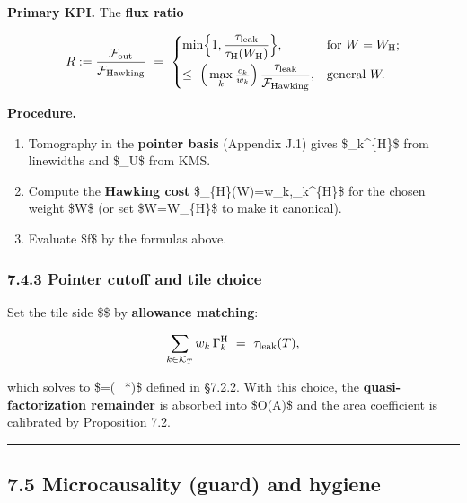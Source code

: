 \documentclass[
]{article}
\providecommand{\tightlist}{%
  \setlength{\itemsep}{0pt}\setlength{\parskip}{0pt}}
\numberwithin{equation}{section}
\begin{document}
\textbf{Primary KPI.} The \textbf{flux ratio}

\[
R:=\frac{\mathcal F_{\rm out}}{\mathcal F_{\rm Hawking}}\ =\
\begin{cases}
\displaystyle \min\!\Big\{1,\frac{\tau_{\rm leak}}{\tau_{\rm H}(W_{\rm H})}\Big\}, & \text{for }W=W_{\rm H};\\[8pt]
\displaystyle \le\ \Big(\max_k \tfrac{c_k}{w_k}\Big)\,\frac{\tau_{\rm leak}}{\mathcal F_{\rm Hawking}}, & \text{general }W.
\end{cases}
\]

\textbf{Procedure.}

\begin{enumerate}
\def\labelenumi{\arabic{enumi}.}
\tightlist
\item
  Tomography in the \textbf{pointer basis} (Appendix J.1) gives
  \$\Gamma\_k\^{}\{\rm H\}\$ from linewidths and \$\beta\_U\$ from KMS.
\item
  Compute the \textbf{Hawking cost}
  \$\tau\_\{\rm H\}(W)=\sum w\_k,\Gamma\_k\^{}\{\rm H\}\$ for the chosen
  weight \$W\$ (or set \$W=W\_\{\rm H\}\$ to make it canonical).
\item
  Evaluate \$f\$ by the formulas above.
\end{enumerate}

\hypertarget{pointer-cutoff-and-tile-choice}{%
\subsubsection{7.4.3 Pointer cutoff and tile
choice}\label{pointer-cutoff-and-tile-choice}}

Set the tile side \$\ell\$ by \textbf{allowance matching}:

\[
\sum_{k\in\mathcal K_T} w_k\,\Gamma_k^{\rm H}\ =\ \tau_{\rm leak}(T),
\]

which solves to \$\ell=\Theta(\ell\_*)\$ defined in §7.2.2. With this
choice, the \textbf{quasi-factorization remainder} is absorbed into
\$O(\textbar{}\partial A\textbar)\$ and the area coefficient is
calibrated by Proposition 7.2.

\begin{center}\rule{0.5\linewidth}{0.5pt}\end{center}

\hypertarget{microcausality-guard-and-hygiene}{%
\subsection{7.5 Microcausality (guard) and
hygiene}\label{microcausality-guard-and-hygiene}}
\end{document}
